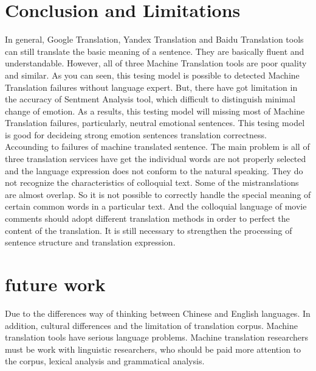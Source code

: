 \documentclass[conference]{IEEEtran}
\begin{document}
\begin{CJK*}{UTF8}{gbsn}
 \section{Conclusion and Limitations}
In general, Google Translation, Yandex Translation and Baidu Translation tools
can still translate the basic meaning of a sentence. They are basically fluent
and understandable. However, all of three Machine Translation tools are poor
quality and similar. As you can seen, this tesing model is possible to detected Machine
Translation failures without language expert. But, there have got limitation in
the accuracy of Sentment Analysis tool, which difficult to distinguish minimal
change of emotion. As a results, this testing model will missing most of Machine
Translation failures, particularly, neutral emotional sentences. This tesing
model is good for decideing strong emotion sentences translation correctness.
Accounding to failures of machine translated sentence. The main problem is all
of three translation services have get the individual words are not properly
selected and the language expression does not conform to the natural speaking.
They do not recognize the characteristics of colloquial text. Some of the
mistranslations are almost overlap. So it is not possible to correctly handle
the special meaning of certain common words in a particular text. And the
colloquial language of movie comments should adopt different translation methods
in order to perfect the content of the translation. It is still necessary to
strengthen the processing of sentence structure and translation expression.

\section{future work}
Due to the differences way of thinking between Chinese and English languages. In
addition, cultural differences and the limitation of translation corpus. Machine
translation tools have serious language problems. Machine translation
researchers must be work with linguistic researchers, who should be paid more
attention to the corpus, lexical analysis and grammatical analysis.



\end{CJK*}
\end{document}
